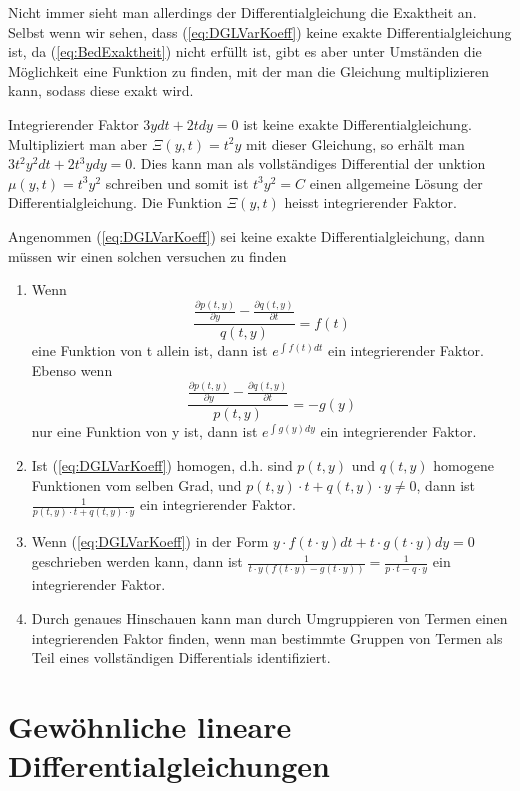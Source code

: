 Nicht immer sieht man allerdings der Differentialgleichung die Exaktheit an.
Selbst wenn wir sehen, dass (\ref{eq:DGLVarKoeff}) keine exakte
Differentialgleichung ist, da (\ref{eq:BedExaktheit}) nicht erfüllt ist, gibt
es aber unter Umständen die Möglichkeit eine Funktion zu finden, mit der man
die Gleichung multiplizieren kann, sodass diese exakt wird. 
\begin{note}{Integrierender Faktor}
  $3ydt+2tdy=0$ ist keine exakte Differentialgleichung. Multipliziert man aber
  $\Xi(y,t)=t^2y$ mit dieser Gleichung, so erhält man $3t^2y^2dt+2t^3ydy=0$.
  Dies kann man als vollständiges Differential der unktion $\mu(y,t)=t^3y^2$
  schreiben und somit ist $t^3y^2=C$ einen allgemeine Lösung der
  Differentialgleichung. Die Funktion $\Xi(y,t)$ heisst integrierender Faktor.
\end{note}
Angenommen (\ref{eq:DGLVarKoeff}) sei keine exakte Differentialgleichung, 
dann müssen wir einen solchen versuchen zu finden
\begin{enumerate}
    \item Wenn 
    \[\frac{\frac{\partial p(t,y)}{\partial y}-\frac{\partial q(t,y)}{\partial t}}{q(t,y)}=f(t)\] 
    eine Funktion von t allein ist, dann ist $e^{\int f(t)dt}$ ein integrierender Faktor. 
    Ebenso wenn
    \[\frac{\frac{\partial p(t,y)}{\partial y}-\frac{\partial q(t,y)}{\partial t}}{p(t,y)}=-g(y)\]
    nur eine Funktion von y ist, dann ist $e^{\int g(y)dy}$ ein integrierender Faktor.
    \item Ist (\ref{eq:DGLVarKoeff}) homogen, d.h. sind $p(t,y)$ und $q(t,y)$ homogene Funktionen vom selben Grad, und $p(t,y)\cdot t+q(t,y)\cdot y\ne 0$, dann ist
    $\frac{1}{p(t,y)\cdot t+q(t,y)\cdot y}$ ein integrierender Faktor.
    \item Wenn (\ref{eq:DGLVarKoeff}) in der Form $y\cdot f(t\cdot y)dt+t\cdot g(t\cdot y)dy=0$
    geschrieben werden kann, dann ist $\frac{1}{t\cdot y(f(t\cdot y)-g(t\cdot y))}=\frac{1}{p\cdot t-q\cdot y}$ ein integrierender Faktor.
    \item Durch genaues Hinschauen kann man durch Umgruppieren von Termen einen
      integrierenden Faktor finden, wenn man bestimmte Gruppen von Termen als
      Teil eines vollständigen Differentials identifiziert.
\end{enumerate}
%
\section{Gewöhnliche lineare Differentialgleichungen}
